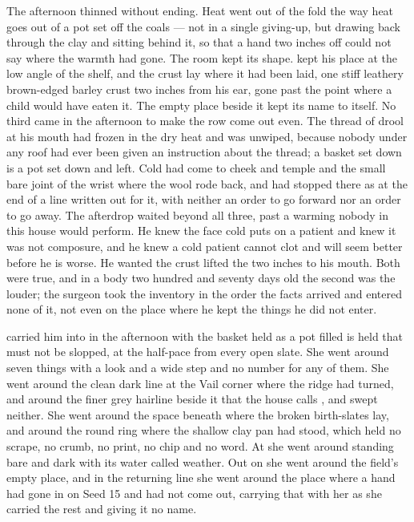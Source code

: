 The afternoon thinned without ending. Heat went out of the fold the way heat goes out of a pot set off the coals --- not in a single giving-up, but drawing back through the clay and sitting behind it, so that a hand two inches off could not say where the warmth had gone. The room kept its shape.  kept his place at the low angle of the shelf, and the crust lay where it had been laid, one stiff leathery brown-edged barley crust two inches from his ear, gone past the point where a child would have eaten it. The empty place beside it kept its name to itself. No third came in the afternoon to make the row come out even. The thread of drool at his mouth had frozen in the dry heat and was unwiped, because nobody under any roof had ever been given an instruction about the thread; a basket set down is a pot set down and left. Cold had come to cheek and temple and the small bare joint of the wrist where the wool rode back, and had stopped there as at the end of a line written out for it, with neither an order to go forward nor an order to go away. The afterdrop waited beyond all three, past a warming nobody in this house would perform. He knew the face cold puts on a patient and knew it was not composure, and he knew a cold patient cannot clot and will seem better before he is worse. He wanted the crust lifted the two inches to his mouth. Both were true, and in a body two hundred and seventy days old the second was the louder; the surgeon took the inventory in the order the facts arrived and entered none of it, not even on the place where he kept the things he did not enter.

 carried him into  in the afternoon with the basket held as a pot filled is held that must not be slopped, at the half-pace from every open slate. She went around seven things with a look and a wide step and no number for any of them. She went around the clean dark line at the Vail corner where the  ridge had turned, and around the finer grey hairline beside it that the house calls , and swept neither. She went around the space beneath  where the broken birth-slates lay, and around the round ring where the shallow clay pan had stood, which held no scrape, no crumb, no print, no chip and no word. At  she went around  standing bare and dark with its water called weather. Out on  she went around the field's empty place, and in the returning line she went around the place where a hand had gone in on Seed 15 and had not come out, carrying that with her as she carried the rest and giving it no name.

